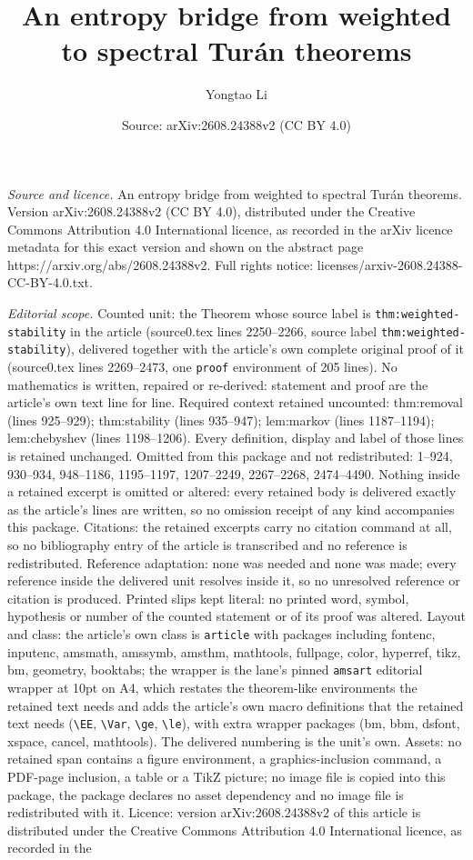 \documentclass[10pt,a4paper]{amsart}
\title[An entropy bridge from weighted to spectral Tur\'{a}n theore]{An entropy bridge from weighted to spectral Tur\'{a}n theorems}
\author{Yongtao Li}
\date{Source: arXiv:2608.24388v2 (CC BY 4.0)}
\begin{document}
\maketitle

\noindent\emph{Source and licence.} An entropy bridge from weighted to spectral Tur\'{a}n theorems. Version arXiv:2608.24388v2 (CC BY 4.0), distributed under the Creative Commons Attribution 4.0 International licence, as recorded in the arXiv licence metadata for this exact version and shown on the abstract page https://arxiv.org/abs/2608.24388v2. Full rights notice: licenses/arxiv-2608.24388-CC-BY-4.0.txt.\par\smallskip

\noindent\textit{Editorial scope.} Counted unit: the Theorem whose source label is \texttt{thm:weighted-stability} in the article (source0.tex lines 2250--2266, source label \texttt{thm:weighted-stability}), delivered together with the article's own complete original proof of it (source0.tex lines 2269--2473, one \texttt{proof} environment of 205 lines). No mathematics is written, repaired or re-derived: statement and proof are the article's own text line for line. Required context retained uncounted: thm:removal (lines 925--929); thm:stability (lines 935--947); lem:markov (lines 1187--1194); lem:chebyshev (lines 1198--1206). Every definition, display and label of those lines is retained unchanged. Omitted from this package and not redistributed: 1--924, 930--934, 948--1186, 1195--1197, 1207--2249, 2267--2268, 2474--4490. Nothing inside a retained excerpt is omitted or altered: every retained body is delivered exactly as the article's lines are written, so no omission receipt of any kind accompanies this package. Citations: the retained excerpts carry no citation command at all, so no bibliography entry of the article is transcribed and no reference is redistributed. Reference adaptation: none was needed and none was made; every reference inside the delivered unit resolves inside it, so no unresolved reference or citation is produced. Printed slips kept literal: no printed word, symbol, hypothesis or number of the counted statement or of its proof was altered. Layout and class: the article's own class is \texttt{article} with packages including fontenc, inputenc, amsmath, amssymb, amsthm, mathtools, fullpage, color, hyperref, tikz, bm, geometry, booktabs; the wrapper is the lane's pinned \texttt{amsart} editorial wrapper at 10pt on A4, which restates the theorem-like environments the retained text needs and adds the article's own macro definitions that the retained text needs (\texttt{\textbackslash EE}, \texttt{\textbackslash Var}, \texttt{\textbackslash ge}, \texttt{\textbackslash le}), with extra wrapper packages (bm, bbm, dsfont, xspace, cancel, mathtools). The delivered numbering is the unit's own. Assets: no retained span contains a figure environment, a graphics-inclusion command, a PDF-page inclusion, a table or a TikZ picture; no image file is copied into this package, the package declares no asset dependency and no image file is redistributed with it. Licence: version arXiv:2608.24388v2 of this article is distributed under the Creative Commons Attribution 4.0 International licence, as recorded in the 
\end{document}

